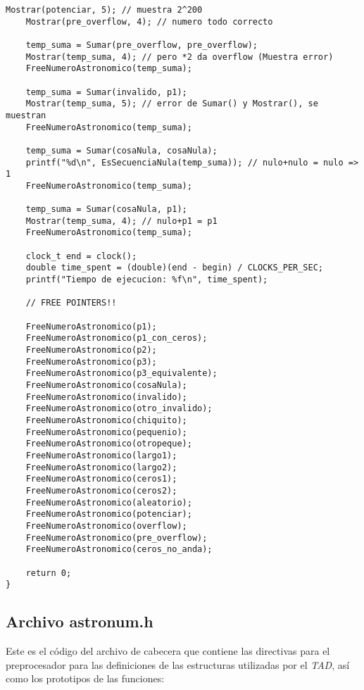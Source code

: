 \documentclass[a4paper, 12pt]{article}
\begin{document}
\begin{lstlisting}[style=C]
    Mostrar(potenciar, 5); // muestra 2^200
    Mostrar(pre_overflow, 4); // numero todo correcto

    temp_suma = Sumar(pre_overflow, pre_overflow);
    Mostrar(temp_suma, 4); // pero *2 da overflow (Muestra error)
    FreeNumeroAstronomico(temp_suma);

    temp_suma = Sumar(invalido, p1);
    Mostrar(temp_suma, 5); // error de Sumar() y Mostrar(), se muestran
    FreeNumeroAstronomico(temp_suma);

    temp_suma = Sumar(cosaNula, cosaNula);
    printf("%d\n", EsSecuenciaNula(temp_suma)); // nulo+nulo = nulo => 1
    FreeNumeroAstronomico(temp_suma);

    temp_suma = Sumar(cosaNula, p1);
    Mostrar(temp_suma, 4); // nulo+p1 = p1
    FreeNumeroAstronomico(temp_suma);

    clock_t end = clock();
    double time_spent = (double)(end - begin) / CLOCKS_PER_SEC;
    printf("Tiempo de ejecucion: %f\n", time_spent);

    // FREE POINTERS!!

    FreeNumeroAstronomico(p1);
    FreeNumeroAstronomico(p1_con_ceros);
    FreeNumeroAstronomico(p2);
    FreeNumeroAstronomico(p3);
    FreeNumeroAstronomico(p3_equivalente);
    FreeNumeroAstronomico(cosaNula);
    FreeNumeroAstronomico(invalido);
    FreeNumeroAstronomico(otro_invalido);
    FreeNumeroAstronomico(chiquito);
    FreeNumeroAstronomico(pequenio);
    FreeNumeroAstronomico(otropeque);
    FreeNumeroAstronomico(largo1);
    FreeNumeroAstronomico(largo2);
    FreeNumeroAstronomico(ceros1);
    FreeNumeroAstronomico(ceros2);
    FreeNumeroAstronomico(aleatorio);
    FreeNumeroAstronomico(potenciar);
    FreeNumeroAstronomico(overflow);
    FreeNumeroAstronomico(pre_overflow);
    FreeNumeroAstronomico(ceros_no_anda);

    return 0;
}
\end{lstlisting}

\subsection{Archivo astronum.h} \label{header-astronum}

Este es el código del archivo de cabecera que contiene las directivas para el preprocesador para las definiciones de las estructuras utilizadas por el \emph{TAD}, así como los prototipos de las funciones:
\end{document}
